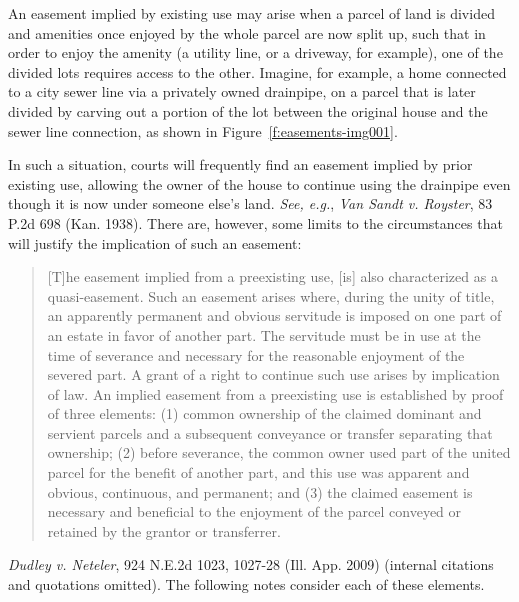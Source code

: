 An easement implied by existing use may arise when a parcel of land is divided
and amenities once enjoyed by the whole parcel are now split up, such that in
order to enjoy the amenity (a utility line, or a driveway, for example), one of
the divided lots requires access to the other. Imagine, for example, a home
connected to a city sewer line via a privately owned drainpipe, on a parcel that
is later divided by carving out a portion of the lot between the original house
and the sewer line connection, as shown in Figure~\ref{f:easements-img001}.


In such a situation, courts will frequently find an easement implied by prior
existing use, allowing the owner of the house to continue using the drainpipe
even though it is now under someone else's land. \textit{See, e.g.},  \emph{Van
Sandt v. Royster}, 83 P.2d 698 (Kan. 1938). There are, however, some limits to
the circumstances that will justify the implication of such an easement:
\begin{quote}
[T]he easement implied from a preexisting use, [is] also characterized as a
quasi-easement. Such an easement arises where, during the unity of title, an
apparently permanent and obvious servitude is imposed on one part of  an estate
in favor of another part. The servitude must be in use at the time of severance
and necessary for the reasonable enjoyment of the severed part. A grant of a
right to continue such use arises by implication of law. An implied easement
from a preexisting use is established by proof of three elements: (1) common
ownership of the claimed dominant and servient parcels and a subsequent
conveyance or transfer separating that ownership; (2) before severance, the
common owner used part of the united parcel for the benefit of another part, and
this use was apparent and obvious, continuous, and permanent; and (3) the
claimed easement is necessary and beneficial to the enjoyment of the parcel
conveyed or retained by the grantor or transferrer. 
\end{quote}
\emph{Dudley v. Neteler}, 924 N.E.2d 1023, 1027-28 (Ill. App. 2009) (internal
citations and quotations omitted). The following notes consider each of these
elements.


